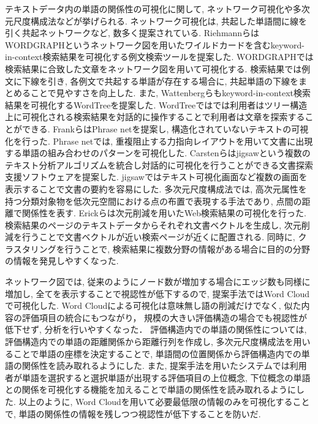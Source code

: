 \documentclass[syuuron]{kuee}
\begin{document}
		テキストデータ内の単語の関係性の可視化に関して, ネットワーク可視化や多次元尺度構成法などが挙げられる. 
		ネットワーク可視化は, 共起した単語間に線を引く共起ネットワークなど, 数多く提案されている. 
		RiehmannらはWORDGRAPHというネットワーク図を用いたワイルドカードを含むkeyword-in-context検索結果を可視化する例文検索ツールを提案した\cite{wg1}. 
		WORDGRAPHでは検索結果に合致した文章をネットワーク図を用いて可視化する. 
		検索結果では例文に下線を引き, 各例文で共起する単語が存在する場合に, 共起単語の下線をまとめることで見やすさを向上した. 
		また, Wattenbergらもkeyword-in-context検索結果を可視化するWordTreeを提案した\cite{wt1}. 
		WordTreeではでは利用者はツリー構造上に可視化される検索結果を対話的に操作することで利用者は文章を探索することができる. 
		FrankらはPhrase netを提案し, 構造化されていないテキストの可視化を行った\cite{pn1}. 
		Phrase netでは, 重複阻止する力指向レイアウトを用いて文書に出現する単語の組み合わせのパターンを可視化した. 
		Carstenらはjigsawという複数のテキスト分析アルゴリズムを統合し対話的に可視化を行うことができる文書探索支援ソフトウェアを提案した\cite{jig1}. 
		jigsawではテキスト可視化画面など複数の画面を表示することで文書の要約を容易にした. 
		多次元尺度構成法では, 高次元属性を持つ分類対象物を低次元空間における点の布置で表現する手法であり, 点間の距離で関係性を表す. 
		Erickらは次元削減を用いたWeb検索結果の可視化を行った\cite{or1}. 
		検索結果のページのテキストデータからそれぞれ文書ベクトルを生成し, 次元削減を行うことで文書ベクトルが近い検索ページが近くに配置される. 
		同時に, クラスタリングを行うことで, 検索結果に複数分野の情報がある場合に目的の分野の情報を発見しやすくなった. 
		
		ネットワーク図では, 従来のようにノード数が増加する場合にエッジ数も同様に増加し, 全てを表示することで視認性が低下するので, 
		提案手法ではWord Cloudで可視化した. 
		Word Cloudによる可視化は意味無し語の削減だけでなく, 似た内容の評価項目の統合にもつながり，
		規模の大きい評価構造の場合でも視認性が低下せず, 分析を行いやすくなった．
		評価構造内での単語の関係性については, 評価構造内での単語の距離関係から距離行列を作成し, 
		多次元尺度構成法を用いることで単語の座標を決定することで, 単語間の位置関係から評価構造内での単語の関係性を読み取れるようにした. 
		また, 提案手法を用いたシステムでは利用者が単語を選択すると選択単語が出現する評価項目の上位概念, 
		下位概念の単語との関係を可視化する機能を加えることで単語の関係性を読み取れるようにした.
		以上のように, Word Cloudを用いて必要最低限の情報のみを可視化することで, 単語の関係性の情報を残しつつ視認性が低下することを防いだ. 
		
\end{document}
